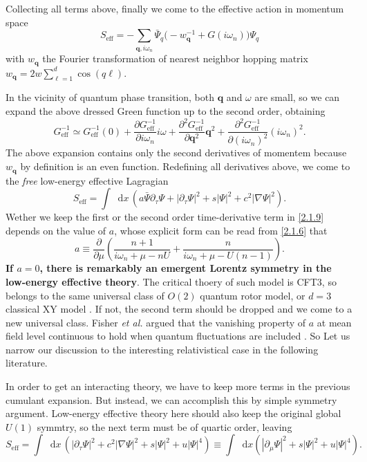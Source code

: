 \documentclass[10pt,nofootinbib]{revtex4}
\newcommand*\dd{\mathop{}\!\mathrm{d}}
\numberwithin{equation}{section}
\begin{document}
		Collecting all terms above, finally we come to the effective action in momentum space 
		\begin{equation}\label{2.1.7}
			S_{\text{eff}}=-\sum_{\bm{q},i\omega_n}\bar{\Psi}_{q}\bigg(-w_{\bm{q}}^{-1}+G(i\omega_n)\bigg)\Psi_q
		\end{equation}
		with $w_{\bm{q}}$ the Fourier transformation of nearest neighbor hopping matrix $w_{\bm{q}}=2w\sum_{\ell=1}^d\cos(q\ell)$.\par
		In the vicinity of quantum phase transition, both $\bm{q}$ and $\omega$ are small, so we can expand the above dressed Green function up to the second order, obtaining
		\begin{equation}\label{2.1.8}
			G_{\text{eff}}^{-1}\simeq G_{\text{eff}}^{-1}(0)+\dfrac{\partial G_{\text{eff}}^{-1}}{\partial i\omega_n}i\omega+\dfrac{\partial^2G_{\text{eff}}^{-1}}{\partial \bm{q}^2}\bm{q}^2+ \dfrac{\partial^2G_{\text{eff}}^{-1}}{\partial (i\omega_n)^2}(i\omega_n)^2.
		\end{equation}
		The above expansion contains only the second derivatives of momentem because $w_{\bm{q}}$ by definition is an even function. Redefining all derivatives above, we come to the \emph{free} low-energy effective Lagragian
		\begin{equation}\label{2.1.9}
			S_{\text{eff}}=\int\dd x\,\left(a\bar{\Psi}\partial_\tau\Psi+|\partial_\tau\Psi|^2+s|\Psi|^2+c^2|\nabla\Psi|^2\right).
		\end{equation}
		Wether we keep the first or the second order time-derivative term in \eqref{2.1.9} depends on the value of $a$, whose explicit form can be read from \eqref{2.1.6} that
		\begin{equation}\label{2.1.10}
			a\equiv\dfrac{\partial}{\partial \mu}\left(\dfrac{n+1}{i\omega_n+\mu-nU}+\dfrac{n}{i\omega_n+\mu-U(n-1)}\right).
		\end{equation}
		\textbf{If $a=0$, there is remarkably an emergent Lorentz symmetry in the low-energy effective theory}. The critical thoery of such model is CFT3, so belongs to the same universal class of $O(2)$ quantum rotor model, or $d=3$ classical XY model \cite{sachdev2011quantum}. If not, the second term should be dropped and we come to a new universal class. Fisher {\it et al.} argued that the vanishing property of $a$ at mean field level continuous to hold when quantum fluctuations are included \cite{fisher1989boson}. So Let us narrow our discussion to the interesting relativistical case in the following literature.\par 
		In order to get an interacting theory, we have to keep more terms in the previous cumulant expansion. But instead, we can accomplish this by simple symmetry argument. Low-energy effective theory here should also keep the original global $U(1)$ symmtry, so the next term must be of quartic order, leaving
		\begin{equation}\label{2.1.11}
			S_{\text{eff}}=\int\dd x\,\left(|\partial_\tau\Psi|^2+c^2|\nabla\Psi|^2+s|\Psi|^2+u|\Psi|^4\right)\equiv\int\dd x\left(|\partial_\mu\Psi|^2+s|\Psi|^2+u|\Psi|^4\right).
		\end{equation}
\end{document}
